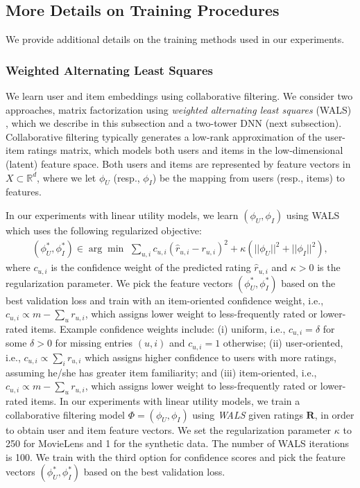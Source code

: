 \documentclass[manuscript,screen,nonacm]{acmart}
\newcommand{\1}{{\mathbf 1}}
\newcommand{\bfR}{\mathbf{R}}
\newcommand{\hatr}{\hat{r}}
\theoremstyle{TheoremNum}
\begin{document}
\subsection{More Details on Training Procedures}
\label{app:training}

We provide additional details on the training methods used in our experiments.

\subsubsection{Weighted Alternating Least Squares}
\label{app:wals_training}

We learn user and item embeddings using collaborative filtering. We consider two approaches, matrix factorization using \emph{weighted alternating least squares} (WALS) \cite{wals:icdm08}, which we describe in this subsection and
a two-tower DNN (next subsection).
Collaborative filtering typically generates a low-rank approximation of the user-item ratings matrix, which models both users and items in the low-dimensional (latent) feature space. Both users and items are represented by feature vectors in $X \subset\mathbb R^d$, where we let $\phi_U$ (resp., $\phi_I$) be the mapping from users (resp., items) to features.

In our experiments with linear utility models, we learn $(\phi_U, \phi_I)$ using %
WALS which uses the following regularized objective:
\begin{align}
(\phi^*_U, \phi^*_I)\in\arg\min\,\,\sum_{u,i}c_{u,i}(\hatr_{u,i}-r_{u,i})^2+ \kappa(||\phi_U||^2 + ||\phi_I||^2),
\end{align}
where $c_{u,i}$ is the confidence weight of the predicted rating $\hatr_{u,i}$ and $\kappa > 0$ is the regularization parameter. We pick the feature vectors $(\phi^*_U, \phi^*_I)$ based on the best validation loss and train with an item-oriented confidence weight, i.e., 
$c_{u,i}\propto m -\sum_u r_{u,i}$, which assigns lower weight to less-frequently rated or lower-rated items.
Example confidence weights include: (i) uniform, i.e., $c_{u,i}=\delta$ for some $\delta >0$ for missing entries $(u,i)$ and $c_{u,i}=1$ otherwise; (ii) user-oriented, i.e., $c_{u,i}\propto\sum_i r_{u,i}$ which assigns higher confidence to users with more ratings, assuming he/she has greater item familiarity; and (iii) item-oriented, i.e., 
$c_{u,i}\propto m -\sum_u r_{u,i}$, which assigns lower weight to less-frequently rated or lower-rated items. In our experiments with linear utility models, we train a collaborative filtering model $\Phi = (\phi_U, \phi_I)$ using \emph{WALS} given ratings $\bfR$, in order to obtain user and item feature vectors.
We set the regularization parameter $\kappa$ to 250 for MovieLens and 1 for the synthetic data. The number of WALS iterations is 100. We train with the third option for confidence scores and pick the feature vectors $(\phi^*_U, \phi^*_I)$ based on the best validation loss.
\end{document}
